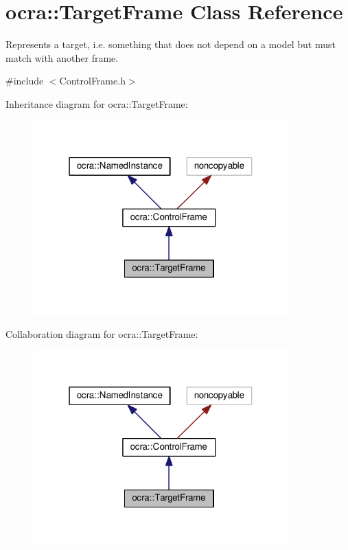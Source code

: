 \hypertarget{classocra_1_1TargetFrame}{}\section{ocra\+:\+:Target\+Frame Class Reference}
\label{classocra_1_1TargetFrame}


Represents a \textquotesingle{}target\textquotesingle{}, i.\+e. something that does not depend on a model but must match with another frame.  




{\ttfamily \#include $<$Control\+Frame.\+h$>$}



Inheritance diagram for ocra\+:\+:Target\+Frame\+:
\nopagebreak
\begin{figure}[H]
\begin{center}
\leavevmode
\includegraphics[width=280pt]{df/d7d/classocra_1_1TargetFrame__inherit__graph}
\end{center}
\end{figure}


Collaboration diagram for ocra\+:\+:Target\+Frame\+:
\nopagebreak
\begin{figure}[H]
\begin{center}
\leavevmode
\includegraphics[width=280pt]{df/d29/classocra_1_1TargetFrame__coll__graph}
\end{center}
\end{figure}
